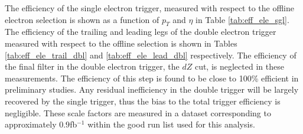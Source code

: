
The efficiency of the single electron trigger, measured 
with respect to the offline electron selection is shown 
as a function of $p_T$ and $\eta$ in Table \ref{tab:eff_ele_sgl}.
The efficiency of the trailing and leading legs of the double electron trigger
measured with respect to the offline selection is shown
in Tables \ref{tab:eff_ele_trail_dbl} and \ref{tab:eff_ele_lead_dbl} respectively.
The efficiency of the final filter in the double electron trigger, the $dZ$ cut,
is neglected in these measurements.  The efficiency of this step is found to be
close to 100\% efficient in preliminary studies.  Any residual inefficiency
in the double trigger will be largely recovered by the single trigger,
thus the bias to the total trigger efficiency is negligible.
These scale factors are measured in a dataset corresponding
to approximately $0.9$fb$^{-1}$ within the good run list used for this analysis.

